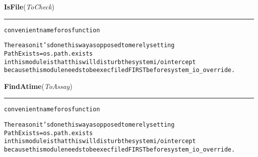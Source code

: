     \vspace{0.5ex}

\hspace{.8\funcindent}\begin{boxedminipage}{\funcwidth}

    \raggedright \textbf{IsFile}(\textit{ToCheck})

    \vspace{-1.5ex}

    \rule{\textwidth}{0.5\fboxrule}
\setlength{\parskip}{2ex}
\begin{alltt}

convenient name for os function

The reason it's done this way as opposed to merely setting 
        PathExists = os.path.exists
in this module is that this will disturb the system i/o intercept 
because this module needs to be execfiled FIRST before system\_io\_override. 
\end{alltt}

\setlength{\parskip}{1ex}
    \end{boxedminipage}

    \label{System:Utils:FindAtime}

    \vspace{0.5ex}

\hspace{.8\funcindent}\begin{boxedminipage}{\funcwidth}

    \raggedright \textbf{FindAtime}(\textit{ToAssay})

    \vspace{-1.5ex}

    \rule{\textwidth}{0.5\fboxrule}
\setlength{\parskip}{2ex}
\begin{alltt}

convenient name for os function

The reason it's done this way as opposed to merely setting 
        PathExists = os.path.exists
in this module is that this will disturb the system i/o intercept
because this module needs to be execfiled FIRST before system\_io\_override. 
\end{alltt}

\setlength{\parskip}{1ex}
    \end{boxedminipage}

    \label{System:Utils:listdir}

